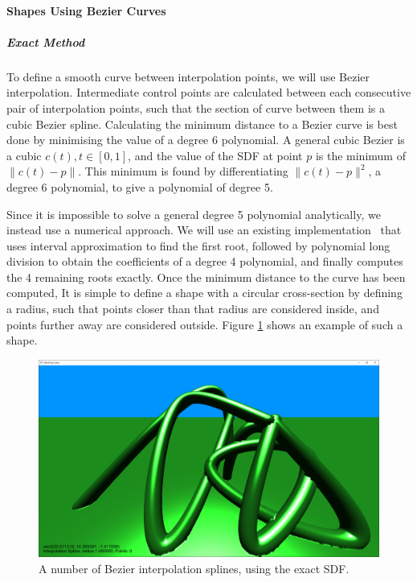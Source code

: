 \documentclass[11pt]{article}
\begin{document}
\paragraph{Shapes Using Bezier Curves}
\subparagraph{Exact Method}
To define a smooth curve between interpolation points, we will use Bezier interpolation. Intermediate control points are calculated between each consecutive pair of interpolation points, such that the section of curve between them is a cubic Bezier spline. Calculating the minimum distance to a Bezier curve is best done by minimising the value of a degree 6 polynomial. A general cubic Bezier is a cubic $c\left(t\right), t \in \left[0,1\right]$, and the value of the SDF at point $p$ is the minimum of $\| c\left(t\right) -p\|$. This minimum is found by differentiating $\| c\left(t\right) -p\|^2$, a degree 6 polynomial, to give a polynomial of degree 5.

Since it is impossible to solve a general degree 5 polynomial analytically, we instead use a numerical approach. We will use an existing implementation~\cite{kraus_2021} that uses interval approximation to find the first root, followed by polynomial long division to obtain the coefficients of a degree 4 polynomial, and finally computes the 4 remaining roots exactly. Once the minimum distance to the curve has been computed, It is simple to define a shape with a circular cross-section by defining a radius, such that points closer than that radius are considered inside, and points further away are considered outside. Figure \ref{fig:exact_bezier} shows an example of such a shape.
\begin{figure}[H]
  \includegraphics[width=\textwidth]{exact_bezier}
  \caption{A number of Bezier interpolation splines, using the exact SDF.}
  \label{fig:exact_bezier}
\end{figure}
\end{document}
